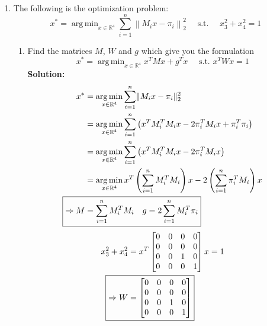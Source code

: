 \documentclass[letta4 paper]{article}
\DeclarePairedDelimiter{\norm}{\lVert}{\rVert}
\numberwithin{equation}{section}
\newcommand{\0}{\mathbf{0}}
\DeclareMathOperator*{\argmin}{arg\,min}
\begin{document}
\begin{enumerate}
	\item The following is the optimization problem:
	\[ 
	x^{*}=\argmin_{x \in \mathbb{R}^{4}} \sum_{i=1}^{n}\left\|M_{i} x-\pi_{i}\right\|_{2}^{2} \quad \text { s.t. } \quad x_{3}^{2}+x_{4}^{2}=1
	\] 
	\begin{enumerate}
		\item Find the matrices $M$, $W$ and $g$ which give you the formulation 
		\[
		x^{*}=\argmin_{x \in \mathbb{R}^{4}} x^{T} M x+g^{T} x 
		\quad \text { s.t. } x^{T} W x=1
		\]
		\textbf{Solution:}
		\begin{align}
			x^{*}&=\argmin_{x \in \mathbb{R}^{4}} \sum_{i=1}^{n}\norm{M_{i} x-\pi_{i}}_{2}^{2} \\
			&= \argmin_{x \in \mathbb{R}^{4}}
			\sum_{i=1}^{n} \left(x^T M_i^T M_i x - 2\pi_i^T M_i x + \pi_i^T \pi_i\right) \\
			&= \argmin_{x \in \mathbb{R}^{4}}
			\sum_{i=1}^{n} \left(x^T M_i^T M_i x - 2\pi_i^T M_i x\right)\\
			&= \argmin_{x \in \mathbb{R}^{4}}
			x^T \left(\sum_{i=1}^{n}M_i^T M_i\right) x - 2\left(\sum_{i=1}^{n}\pi_i^T M_i\right) x \\
			\Aboxed{\Rightarrow M &= \sum_{i=1}^{n}M_i^T M_i \quad g = 2\sum_{i=1}^{n}M_i ^T \pi_i}
		\end{align}
		\begin{align}
			x_{3}^{2}+x_{4}^{2} 
			&=
			x^T 
			\begin{bmatrix}
				0 & 0 & 0 & 0 \\
				0 & 0 & 0 & 0 \\
				0 & 0 & 1 & 0 \\
				0 & 0 & 0 & 1
			\end{bmatrix}
			x = 1 \\
			\Aboxed{\Rightarrow W &= 
				{\begin{bmatrix}
						0 & 0 & 0 & 0 \\
						0 & 0 & 0 & 0 \\
						0 & 0 & 1 & 0 \\
						0 & 0 & 0 & 1
			\end{bmatrix}}}
		\end{align}
		\\		
		

\end{enumerate}
\end{enumerate}
\end{document}
